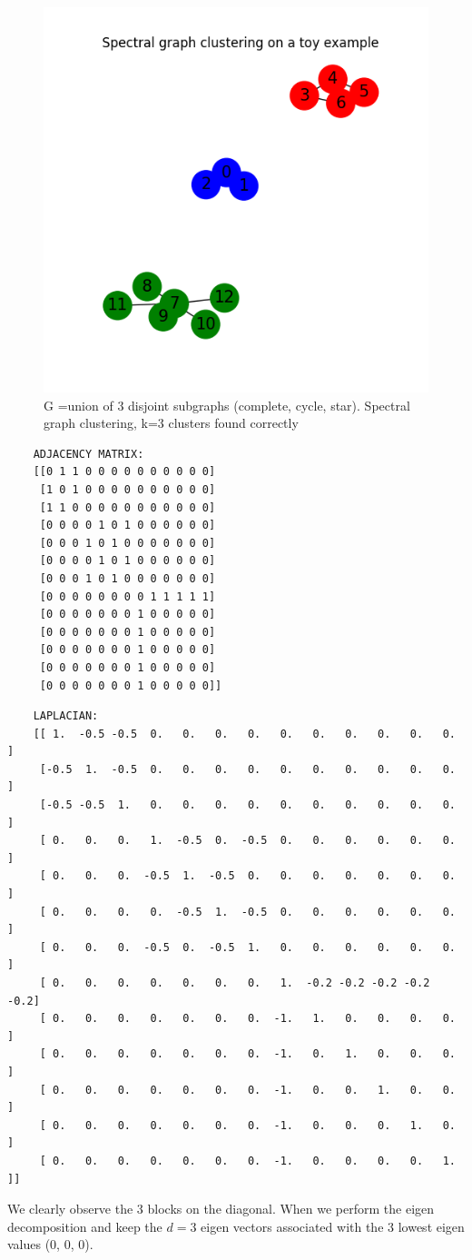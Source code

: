 \documentclass[a4paper]{article}
\begin{document}
\begin{figure}[ht]
    \centering
    \includegraphics[width=.6\textwidth]{figures/spectral_clustering_toy_example.png}
    \caption{G =union of 3 disjoint subgraphs (complete, cycle, star). Spectral graph clustering, k=3 clusters found correctly}
    \label{fig:spectral_clustering_toy_example}
\end{figure}

\begin{verbatim}
    ADJACENCY MATRIX:
    [[0 1 1 0 0 0 0 0 0 0 0 0 0]
     [1 0 1 0 0 0 0 0 0 0 0 0 0]
     [1 1 0 0 0 0 0 0 0 0 0 0 0]
     [0 0 0 0 1 0 1 0 0 0 0 0 0]
     [0 0 0 1 0 1 0 0 0 0 0 0 0]
     [0 0 0 0 1 0 1 0 0 0 0 0 0]
     [0 0 0 1 0 1 0 0 0 0 0 0 0]
     [0 0 0 0 0 0 0 0 1 1 1 1 1]
     [0 0 0 0 0 0 0 1 0 0 0 0 0]
     [0 0 0 0 0 0 0 1 0 0 0 0 0]
     [0 0 0 0 0 0 0 1 0 0 0 0 0]
     [0 0 0 0 0 0 0 1 0 0 0 0 0]
     [0 0 0 0 0 0 0 1 0 0 0 0 0]]
\end{verbatim}


\pagebreak
\begin{verbatim}
    LAPLACIAN:
    [[ 1.  -0.5 -0.5  0.   0.   0.   0.   0.   0.   0.   0.   0.   0. ]
     [-0.5  1.  -0.5  0.   0.   0.   0.   0.   0.   0.   0.   0.   0. ]
     [-0.5 -0.5  1.   0.   0.   0.   0.   0.   0.   0.   0.   0.   0. ]
     [ 0.   0.   0.   1.  -0.5  0.  -0.5  0.   0.   0.   0.   0.   0. ]
     [ 0.   0.   0.  -0.5  1.  -0.5  0.   0.   0.   0.   0.   0.   0. ]
     [ 0.   0.   0.   0.  -0.5  1.  -0.5  0.   0.   0.   0.   0.   0. ]
     [ 0.   0.   0.  -0.5  0.  -0.5  1.   0.   0.   0.   0.   0.   0. ]
     [ 0.   0.   0.   0.   0.   0.   0.   1.  -0.2 -0.2 -0.2 -0.2 -0.2]
     [ 0.   0.   0.   0.   0.   0.   0.  -1.   1.   0.   0.   0.   0. ]
     [ 0.   0.   0.   0.   0.   0.   0.  -1.   0.   1.   0.   0.   0. ]
     [ 0.   0.   0.   0.   0.   0.   0.  -1.   0.   0.   1.   0.   0. ]
     [ 0.   0.   0.   0.   0.   0.   0.  -1.   0.   0.   0.   1.   0. ]
     [ 0.   0.   0.   0.   0.   0.   0.  -1.   0.   0.   0.   0.   1. ]]
\end{verbatim}
We clearly observe the 3 blocks on the diagonal. When we perform the eigen decomposition
and keep the $d=3$ eigen vectors associated with the 3 lowest eigen values (0, 0, 0). 
\end{document}
